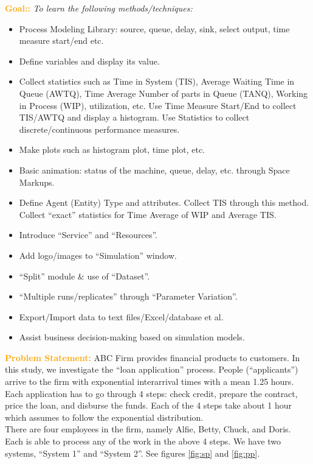 \documentclass{article}
\begin{document}
\textcolor{orange}{\bf Goal::} \textit{To learn the following methods/techniques:}\\
\begin{itemize}
\item Process Modeling Library: source, queue, delay, sink, select output, time measure start/end etc.
\item Define variables and display its value.
\item Collect statistics such as Time in System (TIS), Average Waiting Time in Queue (AWTQ), Time Average Number of parts in Queue (TANQ), Working in Process (WIP), utilization, etc.
Use Time Measure Start/End to collect TIS/AWTQ and display a histogram. Use Statistics to collect discrete/continuous performance measures. 
\item Make plots such as histogram plot, time plot, etc.
\item Basic animation: status of the machine, queue, delay, etc. through Space Markups. 
\item Define Agent (Entity) Type and attributes. Collect TIS through this method. Collect ``exact'' statistics for Time Average of WIP and Average TIS. 
\item Introduce ``Service'' and ``Resources''.
\item Add logo/images to ``Simulation'' window.
\item ``Split'' module \& use of ``Dataset''. 
\item ``Multiple runs/replicates'' through ``Parameter Variation''. 
\item Export/Import data to text files/Excel/database et al.
\item Assist business decision-making based on simulation models.
\end{itemize}


\vskip 0.3in

\textcolor{orange}{\bf Problem Statement:}  ABC Firm provides financial products to customers. In this study, we investigate the ``loan application'' process. People (``applicants'')
arrive to the firm with exponential interarrival times with a mean 1.25 hours. Each application has to go through 4 steps: check credit, prepare the contract, price the loan, and disburse the funds.
Each of the 4 steps take about 1 hour which assumes to follow the exponential distribution.  \\

There are four employees in the firm, namely Alfie, Betty, Chuck, and Doris. Each is able to process any of the work in the above 4 steps. We have two systems, ``System 1'' and ``System 2''. See  figures \ref{fig:sp} and \ref{fig:pp}.
\end{document}
